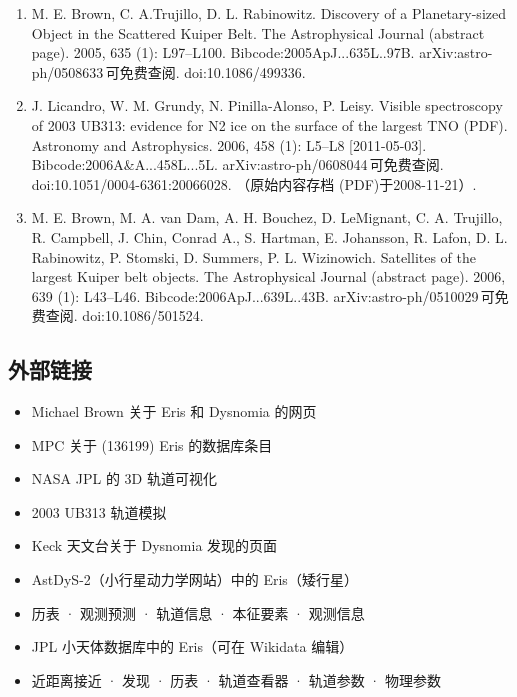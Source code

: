 \begin{enumerate}
\item M. E. Brown, C. A.Trujillo, D. L. Rabinowitz. Discovery of a Planetary-sized Object in the Scattered Kuiper Belt. The Astrophysical Journal (abstract page). 2005, 635 (1): L97–L100. Bibcode:2005ApJ...635L..97B. arXiv:astro-ph/0508633 可免费查阅. doi:10.1086/499336.
\item J. Licandro, W. M. Grundy, N. Pinilla-Alonso, P. Leisy. Visible spectroscopy of 2003 UB313: evidence for N2 ice on the surface of the largest TNO (PDF). Astronomy and Astrophysics. 2006, 458 (1): L5–L8 [2011-05-03]. Bibcode:2006A&A...458L...5L. arXiv:astro-ph/0608044 可免费查阅. doi:10.1051/0004-6361:20066028. （原始内容存档 (PDF)于2008-11-21）.
\item M. E. Brown, M. A. van Dam, A. H. Bouchez, D. LeMignant, C. A. Trujillo, R. Campbell, J. Chin, Conrad A., S. Hartman, E. Johansson, R. Lafon, D. L. Rabinowitz, P. Stomski, D. Summers, P. L. Wizinowich. Satellites of the largest Kuiper belt objects. The Astrophysical Journal (abstract page). 2006, 639 (1): L43–L46. Bibcode:2006ApJ...639L..43B. arXiv:astro-ph/0510029 可免费查阅. doi:10.1086/501524.
\end{enumerate}
\subsection{外部链接}
\begin{itemize}
\item Michael Brown 关于 Eris 和 Dysnomia 的网页  
\item MPC 关于 (136199) Eris 的数据库条目  
\item NASA JPL 的 3D 轨道可视化  
\item 2003 UB313 轨道模拟  
\item Keck 天文台关于 Dysnomia 发现的页面  
\item AstDyS-2（小行星动力学网站）中的 Eris（矮行星）  
\item 历表 · 观测预测 · 轨道信息 · 本征要素 · 观测信息  
\item JPL 小天体数据库中的 Eris（可在 Wikidata 编辑）  
\item 近距离接近 · 发现 · 历表 · 轨道查看器 · 轨道参数 · 物理参数
\end{itemize}












